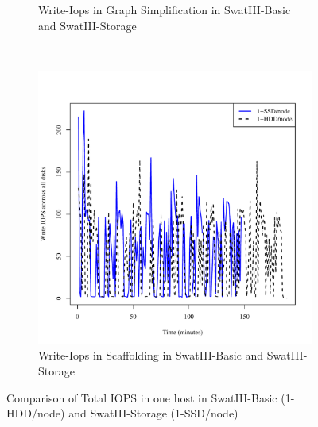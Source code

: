 \documentclass[conference]{IEEEtran}
\begin{document}
\begin{figure}[htb]
\begin{subfigure}[b]{0.3\textwidth}
                \caption{Write-Iops in Graph Simplification in SwatIII-Basic and SwatIII-Storage}
                \label{fig:ECHddSsdWrIops}
        \end{subfigure}
        ~ %
        \begin{subfigure}[b]{0.3\textwidth}
                \includegraphics[width=\textwidth]{Figure/SystemData/Plots/SCFHddSsdWrIops.pdf}
                \caption{Write-Iops in Scaffolding in SwatIII-Basic and SwatIII-Storage}
                \label{fig:SCFHddSsdWrIops}
        \end{subfigure}
	\caption{Comparison of Total IOPS in one host in SwatIII-Basic (1-HDD/node) and SwatIII-Storage (1-SSD/node)} \label{fig:HddSsdRWiops}
\end{figure}
\end{document}
